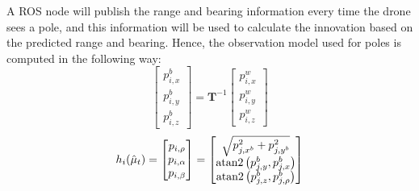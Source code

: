 A ROS node will publish the range and bearing information every time the drone sees a pole, and this information will be used to calculate the innovation based on the predicted range and bearing. Hence, the observation model used for poles is computed in the following way:
\begin{equation}
    \begin{bmatrix}
        p_{i, x}^b \\ p_{i, y}^b \\ p_{i, z}^b
    \end{bmatrix} = \textbf{T}^{-1} \begin{bmatrix}
        p_{i, x}^w \\ p_{i, y}^w \\ p_{i, z}^w
\end{bmatrix}
\label{eq:chapter2:correction:pole:world2body_transform}
\end{equation}
\begin{equation}
    h_i(\hat\mu_t) = \begin{bmatrix}
        p_{i, \rho} \\ p_{i, \alpha} \\ p_{i, \beta}
    \end{bmatrix} = \begin{bmatrix}
    \sqrt{ p_{j, x^b}^2 + p_{j, y^b}^2 } \\
    \operatorname{atan2}\left(p_{j, y}^b, p_{j, x}^b\right) \\
    \operatorname{atan2}\left(p_{j, z}^b, p_{j,\rho}^b\right)
\end{bmatrix}
\label{eq:chapter2:correction:pole:range_bearing}
\end{equation}

